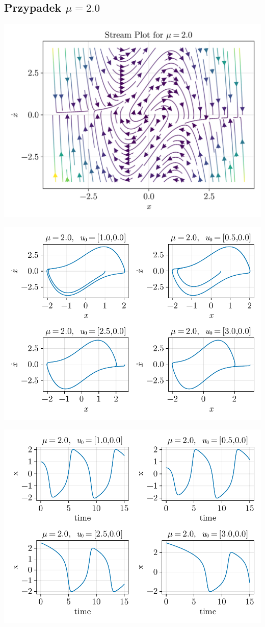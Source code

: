 \clearpage

%
%
\subsection{Przypadek $\mu = 2.0$}
\includegraphics[width=\textwidth]{out/stream_09.png}

\includegraphics[width=\textwidth]{out/phase_09.pdf}

\includegraphics[width=\textwidth]{out/xfromt_09.pdf}

